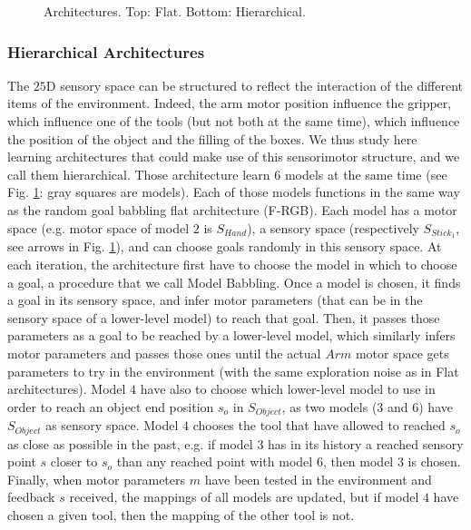 \documentclass[10pt,letterpaper]{article}
\begin{document}
			\begin{figure}[t]
				\center
				
				\vspace{-0.25cm}
				
				\vspace{-0.5cm}
				\caption{Architectures. Top: Flat. Bottom: Hierarchical.}
				\label{Architectures}					
				\vspace{-0.5cm}
			\end{figure}
				
		
		\subsubsection{Hierarchical Architectures}
			
			The $25$D sensory space can be structured to reflect the interaction of the different items of the environment.
			Indeed, the arm motor position influence the gripper, which influence one of the tools (but not both at the same time), which influence the position of the object and the filling of the boxes.
			We thus study here learning architectures that could make use of this sensorimotor structure, and we call them hierarchical.
			Those architecture learn $6$ models at the same time (see Fig. \ref{Architectures}: gray squares are models). 
			Each of those models functions in the same way as the random goal babbling flat architecture (F-RGB). 
			Each model has a motor space (e.g. motor space of model $2$ is $S_{Hand}$), a sensory space (respectively $S_{Stick_1}$, see arrows in Fig. \ref{Architectures}), and can choose goals randomly in this sensory space.
			At each iteration, the architecture first have to choose the model in which to choose a goal, a procedure that we call Model Babbling.
			Once a model is chosen, it finds a goal in its sensory space, and infer motor parameters (that can be in the sensory space of a lower-level model) to reach that goal.
			Then, it passes those parameters as a goal to be reached by a lower-level model, 
			which similarly infers motor parameters and passes those ones until the actual $Arm$ motor space gets parameters to try in the environment (with the same exploration noise as in Flat architectures).
			Model $4$ have also to choose which lower-level model to use in order to reach an object end position $s_o$ in $S_{Object}$, as two models ($3$ and $6$) have $S_{Object}$ as sensory space. 
			Model $4$ chooses the tool that have allowed to reached $s_o$ as close as possible in the past, e.g. if model $3$ has in its history a reached sensory
			point $s$ closer to $s_o$ than any reached point with model $6$, then model $3$ is chosen.
			Finally, when motor parameters $m$ have been tested in the environment and feedback $s$ received, the mappings of all models are updated, but if model $4$ have chosen a given tool, then the mapping of the other tool is not.
			
\end{document}
